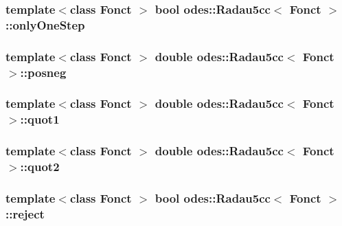 \subsubsection[{only\+One\+Step}]{\setlength{\rightskip}{0pt plus 5cm}template$<$class Fonct $>$ bool {\bf odes\+::\+Radau5cc}$<$ Fonct $>$\+::only\+One\+Step\hspace{0.3cm}{\ttfamily [private]}}\label{classodes_1_1Radau5cc_a99fc26950c9004ac83c8b16f8cc41070}
\hypertarget{classodes_1_1Radau5cc_a4acabf9c37c68c6b50dd32c6a12724a6}{}
\subsubsection[{posneg}]{\setlength{\rightskip}{0pt plus 5cm}template$<$class Fonct $>$ double {\bf odes\+::\+Radau5cc}$<$ Fonct $>$\+::posneg\hspace{0.3cm}{\ttfamily [private]}}\label{classodes_1_1Radau5cc_a4acabf9c37c68c6b50dd32c6a12724a6}
\hypertarget{classodes_1_1Radau5cc_a0c3cc3ba99f9aca257eab5b3a1f4cb43}{}
\subsubsection[{quot1}]{\setlength{\rightskip}{0pt plus 5cm}template$<$class Fonct $>$ double {\bf odes\+::\+Radau5cc}$<$ Fonct $>$\+::quot1\hspace{0.3cm}{\ttfamily [private]}}\label{classodes_1_1Radau5cc_a0c3cc3ba99f9aca257eab5b3a1f4cb43}
\hypertarget{classodes_1_1Radau5cc_a66d2ae6f5ecac2c7983fe54293a6cc30}{}
\subsubsection[{quot2}]{\setlength{\rightskip}{0pt plus 5cm}template$<$class Fonct $>$ double {\bf odes\+::\+Radau5cc}$<$ Fonct $>$\+::quot2\hspace{0.3cm}{\ttfamily [private]}}\label{classodes_1_1Radau5cc_a66d2ae6f5ecac2c7983fe54293a6cc30}
\hypertarget{classodes_1_1Radau5cc_aedacfeb52f4072557c312adf7817bcf6}{}
\subsubsection[{reject}]{\setlength{\rightskip}{0pt plus 5cm}template$<$class Fonct $>$ bool {\bf odes\+::\+Radau5cc}$<$ Fonct $>$\+::reject\hspace{0.3cm}{\ttfamily [private]}}\label{classodes_1_1Radau5cc_aedacfeb52f4072557c312adf7817bcf6}
\hypertarget{classodes_1_1Radau5cc_a6fb4ed14d3b1141a927cbbaf3f3f5536}{}
